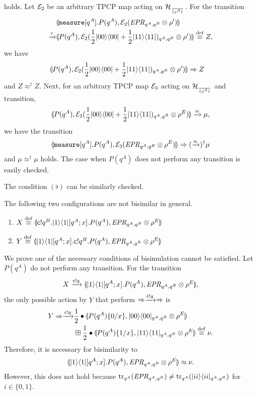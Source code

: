  holds.
 Let $\mathcal{E}_2$ be an arbitrary TPCP map acting on $\mathcal{H}_{\over{\{q^A\}}}$.
 For the transition
\begin{align*}
 &\llparenthesis {\tt measure}[q^A].P(q^A), \mathcal{E}_2(\mathit{EPR}_{q^A, q^B} \otimes \rho') \rrparenthesis\\
 \xrightarrow{\tau}
 &\llparenthesis P(q^A), \mathcal{E}_2(\frac{1}{2}|00\rangle\langle 00| +
 \frac{1}{2}|11\rangle\langle 11|)_{q^A, q^B} \otimes \rho') \rrparenthesis \overset{\mathrm{def}}{\equiv} Z,
\end{align*}
 we have
\begin{align*}
 &\llparenthesis P(q^A), \mathcal{E}_2(\frac{1}{2}|00\rangle\langle 00| +
 \frac{1}{2}|11\rangle\langle 11|)_{q^A, q^B} \otimes \rho') \rrparenthesis
 \Rightarrow Z
\end{align*}
 and $Z \approx^\dagger Z$.
 Next, for an arbitrary TPCP map $\mathcal{E}_3$ acting on $\mathcal{H}_{\over{\{q^A\}}}$
 and transition,
\[
 \llparenthesis P(q^A), \mathcal{E}_3(\frac{1}{2}|00\rangle\langle 00| +
 \frac{1}{2}|11\rangle\langle 11|)_{q^A, q^B} \otimes \rho^E) \rrparenthesis
 \xrightarrow{\alpha} \mu,\]
 we have the transition
 \[
\llparenthesis {\tt measure}[q^A].P(q^A), \mathcal{E}_3(\mathit{EPR}_{q^A, q^B} \otimes \rho^E) \rrparenthesis \Rightarrow
 (\xrightarrow{\alpha})^\dagger
 \mu
\]
 and $\mu \approx^\dagger \mu$ holds.
 The case when $P(q^A)$ does not perform any transition is
 easily checked.

The condition $(\flat)$ can
 be similarly checked.

\begin{ex}
 The following two configurations are not bisimilar in general.
 \begin{enumerate}
  \item $X \overset{\mathrm{def}}{\equiv} \llparenthesis 
	\mathsf{c}! q^B. |1\rangle\langle 1|[q^A;x].P(q^A)
	, 
	\mathit{EPR}_{q^A, q^B} \otimes \rho^E
	 \rrparenthesis$
  \item $Y \overset{\mathrm{def}}{\equiv} \llparenthesis 
        |1\rangle\langle 1|[q^A;x]. \mathsf{c}! q^B.P(q^A)
	, 
	\mathit{EPR}_{q^A, q^B} \otimes \rho^E
	 \rrparenthesis$
 \end{enumerate}
 We prove one of the necessary conditions of bisimulation cannot be
satisfied. Let $P(q^A)$ do not perform any transition.
 For the transition 
\[
  X \xrightarrow{\mathsf{c}! q} \llparenthesis 
 |1\rangle\langle 1|[q^A;x].P(q^A)
 , 
 \mathit{EPR}_{q^A, q^B} \otimes \rho^E
  \rrparenthesis,
\]
 the only possible action by $Y$ that perform $\Rightarrow
 \xrightarrow{\mathsf{c}! q} \Rightarrow$ is
\begin{align*}
 Y \Rightarrow \xrightarrow{\mathsf{c}! q} 
 &\frac{1}{2} \bullet \llparenthesis P(q^A)\{0 / x\}, 
	|00\rangle\langle 00|_{q^A, q^B} \otimes \rho^E
	 \rrparenthesis \\
 &\boxplus
 \frac{1}{2} \bullet \llparenthesis P(q^A)\{1 / x\}, 
	|11\rangle\langle 11|_{q^A, q^B} \otimes \rho^E
	 \rrparenthesis
 \overset{\mathrm{def}}{\equiv} \nu.
\end{align*}
 Therefore, it is necessary for bisimilarity to 
\[
 \llparenthesis 
 |1\rangle\langle 1|[q^A;x].P(q^A)
 , 
 \mathit{EPR}_{q^A, q^B} \otimes \rho^E
  \rrparenthesis
 \approx \nu.
\]
However, this does not hold because
 ${\rm tr}_{q^A}(\mathit{EPR}_{q^A, q^B}) \neq {\rm tr}_{q^A}(|ii\rangle\langle ii|_{q^A, q^B})$
 for $i \in \{0,1\}$.
\end{ex}

